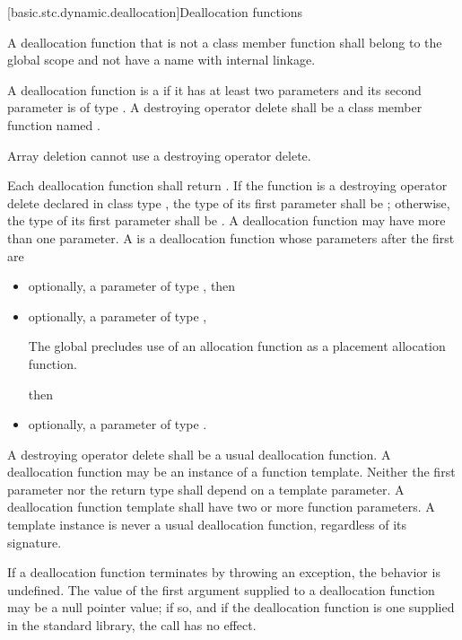 [basic.stc.dynamic.deallocation]{Deallocation functions}

\pnum
{}%
A deallocation function that is not a class member function
shall belong to the global scope and not have a name with internal linkage.

\pnum
A deallocation function
is a 
if it has at least two parameters
and its second parameter
is of type .
A destroying operator delete
shall be a class member function named .
\begin{note}
Array deletion cannot use a destroying operator delete.
\end{note}

\pnum
{}%
Each deallocation function shall return .
If the function is a destroying operator delete
declared in class type ,
the type of its first parameter shall be ;
otherwise, the type of its first
parameter shall be . A deallocation function may have more
than one parameter.
%
A  is a deallocation function
whose parameters after the first are
\begin{itemize}
\item
optionally, a parameter of type , then
\item
optionally, a parameter of type ,
\begin{footnote}
The global 
precludes use of an
allocation function  as a placement
allocation function.
\end{footnote}
then
\item
optionally, a parameter of type .
\end{itemize}
A destroying operator delete shall be a usual deallocation function.
A deallocation function may be an instance of a function
template. Neither the first parameter nor the return type shall depend
on a template parameter.
A deallocation
function template shall have two or more function parameters. A template
instance is never a usual deallocation function, regardless of its
signature.

\pnum
If a deallocation function terminates by throwing an exception, the behavior is undefined.
The value of the first argument supplied to a deallocation function may
be a null pointer value; if so, and if the deallocation function is one
supplied in the standard library, the call has no effect.

